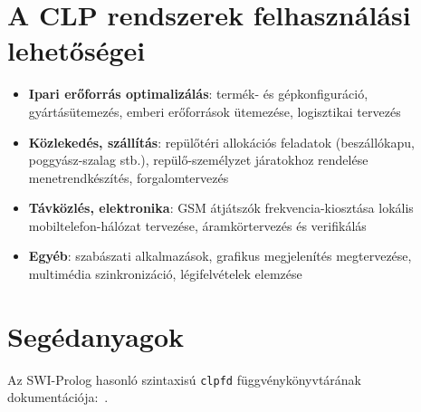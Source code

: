 
\section{A CLP rendszerek felhasználási lehetőségei}

\begin{itemize}
\item {\bf Ipari erőforrás optimalizálás}: termék- és gépkonfiguráció,
gyártásütemezés, emberi erőforrások ütemezése, logisztikai tervezés

\item {\bf Közlekedés, szállítás}: repülőtéri allokációs feladatok
(beszállókapu, poggyász-szalag stb.), repülő-személyzet járatokhoz rendelése
menetrendkészítés, forgalomtervezés

\item {\bf Távközlés, elektronika}: GSM átjátszók frekvencia-kiosztása
lokális mobiltelefon-hálózat tervezése, áramkörtervezés és verifikálás

\item {\bf Egyéb}: szabászati alkalmazások, grafikus megjelenítés megtervezése,
multimédia szinkronizáció, légifelvételek elemzése
\end{itemize}

\section{Segédanyagok}

Az SWI-Prolog hasonló szintaxisú \texttt{clpfd} függvénykönyvtárának dokumentációja:~\cite{swi-clpfd}.
